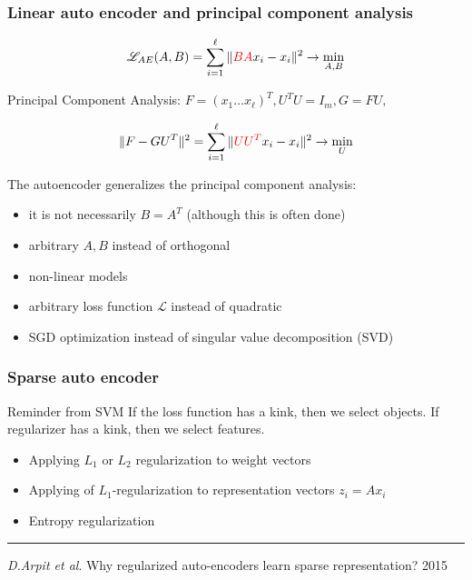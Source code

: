 \documentclass[fullscreen=true, bookmarks=true, hyperref={pdfencoding=unicode}]{beamer}
\begin{document}
\begin{frame}
  \frametitle{Linear auto encoder and principal component analysis}

    $$ \mathscr{L}_{AE}(A, B) = \sum\limits_{i = 1}^\ell \|{\color{red}BA}x_i - x_i \|^2 \to \min \limits_{A,B}$$

    Principal Component Analysis: $F = (x_1\dots x_\ell)^T, U^TU = I_m, G = FU,$

    $$\|F - GU^T \|^2 = \sum\limits_{i = 1}^\ell \|{\color{red}UU^T}x_i - x_i \|^2 \to \min\limits_{U}$$

    \pause
    The autoencoder generalizes the principal component analysis:
    \begin{itemize}
      \pause
      \item it is not necessarily $B=A^T$ (although this is often done)
      \pause
      \item arbitrary $A, B$ instead of orthogonal
      \pause
      \item non-linear models
      \pause
      \item arbitrary loss function $\mathscr{L}$ instead of quadratic
      \pause
      \item SGD optimization instead of singular value decomposition (SVD)
    \end{itemize}
\end{frame}


\begin{frame}
  \frametitle{Sparse auto encoder}

    \begin{exampleblock}{Reminder from SVM}
    If the loss function has a kink, then we select objects. If regularizer has a kink, then we select features.
    \end{exampleblock}

   \begin{itemize}
     \item Applying $L_1$ or $L_2$ regularization to weight vectors
     \item Applying of $L_1$-regularization to representation vectors $z_i = Ax_i$
     \item Entropy regularization
   \end{itemize}

   \vspace{1cm}
   \noindent\rule{8cm}{0.4pt}

   {\footnotesize
   {\it D.Arpit et al}. Why regularized auto-encoders learn sparse representation? 2015}
\end{frame}
\end{document}
